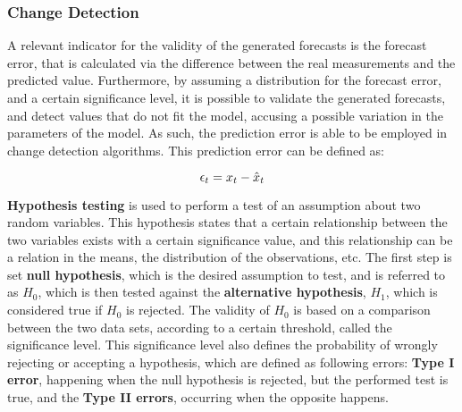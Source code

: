 \subsubsection {Change Detection} \label{sec:change_detection}

A relevant indicator for the validity of the generated forecasts is the forecast error, that is calculated via the difference between the real measurements and the
predicted value. Furthermore, by assuming a distribution for the forecast error, and a certain significance level, it is possible to validate the generated forecasts,
and detect values that do not fit the model, accusing a possible variation in the parameters of the model. As such, the prediction error is able to be employed in 
change detection algorithms. This prediction error can be defined as:

\begin {equation*}
\centering
\epsilon_t = x_t - \hat{x}_t
\end {equation*}

\par \textbf{Hypothesis testing} is used to perform a test of an assumption about two random variables. This hypothesis states that a certain relationship between
the two variables exists with a certain significance value, and this relationship can be a relation in the means, the distribution of the observations, etc. 
The first step is set \textbf{null hypothesis}, which is the desired assumption to test, and is referred to as $H_0$, which is then tested
against the \textbf{alternative hypothesis}, $H_1$, which is considered true if $H_0$ is rejected. The validity of $H_0$ is based on a comparison between the two
data sets, according to a certain threshold, called the significance level. This significance level also defines the probability of wrongly rejecting or accepting a
hypothesis, which are defined as following errors: \textbf{Type I error}, happening when the null hypothesis is rejected, but the performed test is true, and the 
\textbf{Type II errors}, occurring when the opposite happens.

